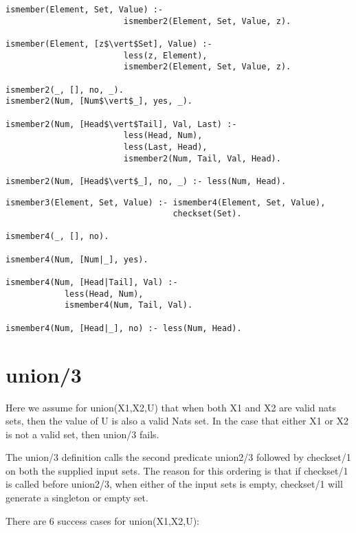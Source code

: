 \documentclass{article}
\begin{document}
\lstset{language=Prolog, frame=lines} \begin{lstlisting}[caption={ismember/3 definition}]
ismember(Element, Set, Value) :- 
                        ismember2(Element, Set, Value, z).
                        
ismember(Element, [z$\vert$Set], Value) :- 
                        less(z, Element),
                        ismember2(Element, Set, Value, z).

ismember2(_, [], no, _).
ismember2(Num, [Num$\vert$_], yes, _).

ismember2(Num, [Head$\vert$Tail], Val, Last) :- 
                        less(Head, Num),
                        less(Last, Head), 
                        ismember2(Num, Tail, Val, Head).
                        
ismember2(Num, [Head$\vert$_], no, _) :- less(Num, Head).
\end{lstlisting}

\lstset{language=Prolog, frame=lines} \begin{lstlisting}[caption={ismember3/3 definition}]
ismember3(Element, Set, Value) :- ismember4(Element, Set, Value), 
                                  checkset(Set).

ismember4(_, [], no).

ismember4(Num, [Num|_], yes).

ismember4(Num, [Head|Tail], Val) :- 
            less(Head, Num), 
            ismember4(Num, Tail, Val).
            
ismember4(Num, [Head|_], no) :- less(Num, Head).
\end{lstlisting}


\section{union/3}
Here we assume for union(X1,X2,U) that when both X1 and X2 are valid nats sets, then the value of U is also a valid Nats set.
In the case that either X1 or X2 is not a valid set, then union/3 fails.

The union/3 definition calls the second predicate union2/3 followed by checkset/1 on both the supplied input sets. The reason for this ordering is that if checkset/1 is called before union2/3, when either of the input sets is empty, checkset/1 will generate a singleton or empty set.

There are 6 success cases for union(X1,X2,U):
\end{document}
